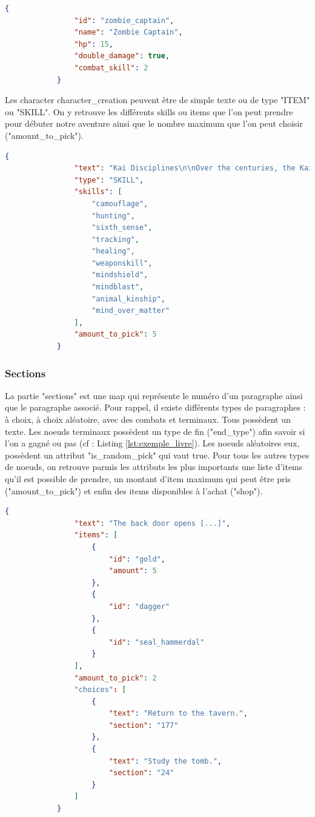			\begin{lstlisting}[gobble=12, language=json, caption=Exemple de personnage]
			{
				"id": "zombie_captain",
				"name": "Zombie Captain",
				"hp": 15,
				"double_damage": true,
				"combat_skill": 2
			}
			\end{lstlisting}

			Les character character\_creation peuvent être de simple texte ou de type "ITEM" ou "SKILL". On y retrouve les différents skills ou items que l'on peut prendre pour débuter notre aventure ainsi que le nombre maximum que l'on peut choisir ("amount\_to\_pick").

			\begin{lstlisting}[gobble=12, language=json, caption=Exemple de character\_creation]
			{
				"text": "Kai Disciplines\n\nOver the centuries, the Kai monks have mastered the skills of the warrior. These skills are known as the Kai Disciplines, [...]",
				"type": "SKILL",
				"skills": [
					"camouflage",
					"hunting",
					"sixth_sense",
					"tracking",
					"healing",
					"weaponskill",
					"mindshield",
					"mindblast",
					"animal_kinship",
					"mind_over_matter"
				],
				"amount_to_pick": 5
			}
			\end{lstlisting}

		\subsubsection{Sections}

			La partie "sections" est une map qui représente le numéro d'un paragraphe ainsi que le paragraphe associé. Pour rappel, il existe différents types de paragraphes : à choix, à choix aléatoire, avec des combats et terminaux. Tous possèdent un texte. Les noeuds terminaux possèdent un type de fin ("end\_type") afin savoir si l'on a gagné ou pas (cf : Listing \ref{lst:exemple_livre}). Les noeuds aléatoires eux, possèdent un attribut "is\_random\_pick" qui vaut true. Pour tous les autres types de noeuds, on retrouve parmis les attributs les plus importants une liste d'items qu'il est possible de prendre, un montant d'item maximum qui peut être pris ("amount\_to\_pick") et enfin des items disponibles à l'achat ("shop").

			\begin{lstlisting}[gobble=12, language=json, caption=Exemple de paragraphe]
			{
				"text": "The back door opens [...]",
				"items": [
					{
						"id": "gold",
						"amount": 5
					},
					{
						"id": "dagger"
					},
					{
						"id": "seal_hammerdal"
					}
				],
				"amount_to_pick": 2
				"choices": [
					{
						"text": "Return to the tavern.",
						"section": "177"
					},
					{
						"text": "Study the tomb.",
						"section": "24"
					}
				]
			}
			\end{lstlisting}

